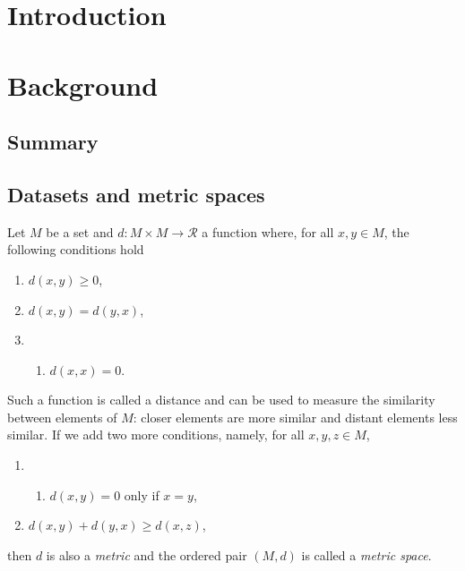 \documentclass[a4paper]{report}
\title{\reporttitle}
\author{\reportauthor}
\begin{document}
\maketitle

\tableofcontents

\chapter{Introduction}
\label{cha:introduction}

\chapter{Background}
\label{cha:background}

\section{Summary}
\label{sec:summary-backgd}


\section{Datasets and metric spaces}
\label{sec:datas-metr-spac}

Let $M$ be a set and $d \colon M \times M \to \mathcal{R}$ a function where,
for all $x,y \in M$, the following conditions hold
\begin{enumerate}
\item $d(x,y) \geq 0$,
\item $d(x,y) = d(y,x)$,
\item
  \begin{enumerate}
  \item $d(x,x) = 0$.
  \end{enumerate}
\end{enumerate}
Such a function is called a distance and can be used to measure the similarity
between elements of $M$: closer elements are more similar and distant elements
less similar.  If we add two more conditions, namely, for all $x,y,z \in M$,
\begin{enumerate}[start=3]
\item
  \begin{enumerate}[start=2]
  \item $d(x,y) = 0$ only if $x=y$,
  \end{enumerate}

\item $d(x,y) + d(y,x) \geq d(x,z)$,
\end{enumerate}
then $d$ is also a \textit{metric} and the ordered pair $(M,d)$ is called a
\textit{metric space}.
\end{document}

